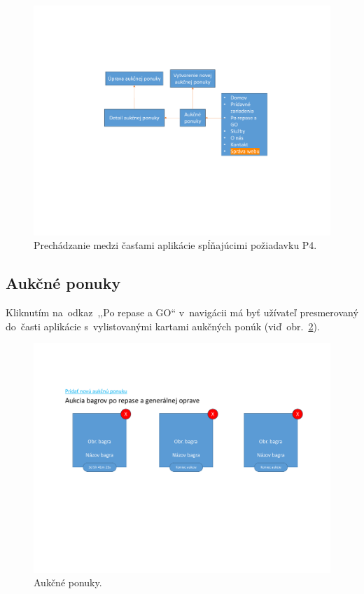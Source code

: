 \begin{figure}[H]\centering
\includegraphics[width=140mm]{../img/UI concept/p4 graph}
\caption{Prechádzanie medzi časťami aplikácie spĺňajúcimi požiadavku P4.}
\label{p4 graph}
\end{figure}

\subsection{Aukčné ponuky}

Kliknutím na~odkaz~,,Po repase a GO`` v~navigácii má byť užívateľ presmerovaný do~časti aplikácie s~vylistovanými kartami aukčných ponúk (viď~obr.~\ref{auction offer cards}).

\begin{figure}[H]\centering
\includegraphics[width=140mm]{../img/UI concept/auction offer cards}
\caption{Aukčné ponuky.}
\label{auction offer cards}
\end{figure}

